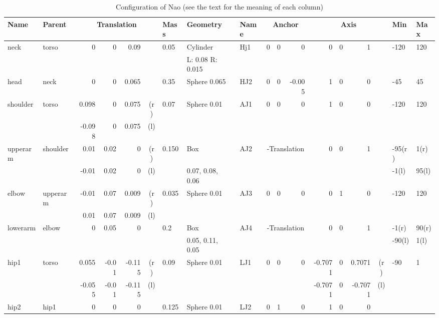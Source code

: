 \begin{landscape}
\begin{table}
  \centering
  \label{tab:nao-conf}
  \caption{Configuration of Nao (see the text for the meaning of each
    column)}
  \newcommand{\threegrid}[1]{\multicolumn{3}{c|}{#1}}
  \newcommand{\fourgrid}[1]{\multicolumn{4}{c|}{#1}}
  \begin{tabular}{|l|l|r@{,}r@{,}r@{}c|l|l|l|r@{,}r@{,}r|r@{,}r@{,}r@{}c|l|l|}
    \hline
    {\bf Name} & {\bf Parent} & \fourgrid{\bf Translation} &
    {\bf Mass} & {\bf Geometry} & {\bf Name} & \threegrid{\bf
      Anchor} & \fourgrid{\bf Axis} & {\bf Min} & {\bf Max} \\
    \hline
    neck & torso & 0&0&0.09& & 0.05 & Cylinder & Hj1 & 0&0&0 & 0&0&1& &
    -120 & 120\\
    & & \fourgrid{} & & L: 0.08 R: 0.015 & & \threegrid{} & \fourgrid{} & &\\
    \hline
    head & neck & 0&0&0.065& & 0.35 & Sphere 0.065 & HJ2 & 0&0&-0.005 &
    1&0&0& & -45 & 45\\
    \hline
    shoulder & torso & 0.098&0&0.075&(r)  & 0.07 & Sphere 0.01& AJ1 &
    0&0&0 & 1&0&0& & -120 & 120 \\
    & & -0.098 & 0 & 0.075&(l) & & & & \threegrid{} & \fourgrid{} & & \\
    \hline
    upperarm & shoulder & 0.01&0.02&0&(r) & 0.150 &
    Box & AJ2 & \threegrid{-Translation} & 0&0&1& & -95(r) & 1(r)  \\
    & & -0.01 & 0.02 & 0&(l) & & 0.07, 0.08, 0.06 & & \threegrid{} & \fourgrid{} & -1(l) & 95(l) \\
    \hline
    elbow & upperarm & -0.01&0.07&0.009&(r) &
    0.035 & Sphere 0.01 & AJ3 & 0&0&0 & 0&1&0& & -120 & 120 \\
    & & 0.01 & 0.07 & 0.009&(l) & & & & \threegrid{} & \fourgrid{} & &\\
    \hline
    lowerarm & elbow & 0&0.05&0& & 0.2 & Box & AJ4 &
    \threegrid{-Translation} & 0&0&1& & -1(r) & 90(r) \\
    & & \fourgrid{} & & 0.05, 0.11, 0.05 & & \threegrid{} & \fourgrid{} & -90(l) & 1(l) \\
    \hline
    hip1 & torso & 0.055&-0.01&-0.115&(r) &
    0.09 & Sphere 0.01 & LJ1 & 0&0&0 & -0.7071&0&0.7071&(r)  & -90 & 1 \\
    & & -0.055 & -0.01 & -0.115&(l) & & & & \threegrid{} & -0.7071&0&-0.7071&(l) & &\\
    \hline
    hip2 & hip1 & 0&0&0& & 0.125 & Sphere 0.01 & LJ2 & 0&1&0 & 1&0&0& &

\end{tabular}
\end{table}
\end{landscape}

